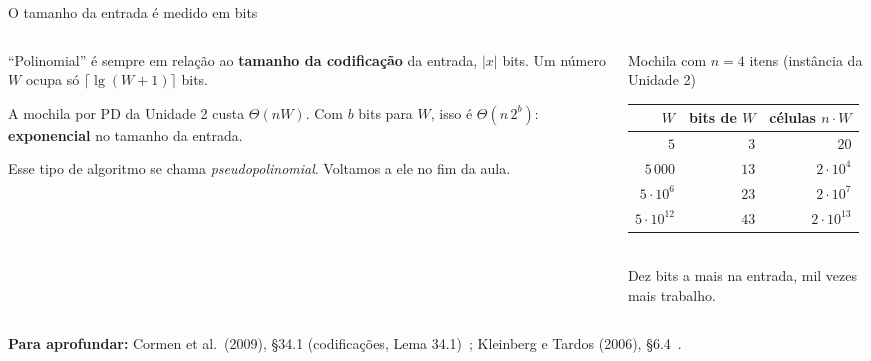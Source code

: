 \documentclass[aspectratio=169,xcolor=table]{beamer}
\newcommand{\fonte}[1]{%
  \vfill
  {\tiny\color{gray!55!black}\textbf{Para aprofundar:} #1\par}%
}
\begin{document}
\begin{frame}{O tamanho da entrada é medido em bits}
  \begin{columns}[T]
    \begin{column}{0.5\textwidth}
      \small
      ``Polinomial'' é sempre em relação ao \textbf{tamanho da codificação} da entrada,
      $|x|$ bits. Um número $W$ ocupa só $\lceil \lg (W+1) \rceil$ bits.
      \medskip

      A mochila por PD da Unidade 2 custa $\Theta(nW)$. Com $b$ bits para $W$, isso é
      $\Theta(n\, 2^b)$: \textbf{exponencial} no tamanho da entrada.
      \medskip

      {\scriptsize Esse tipo de algoritmo se chama \emph{pseudopolinomial}. Voltamos a ele no
      fim da aula.\par}
    \end{column}
    \begin{column}{0.46\textwidth}
      \scriptsize
      \centering
      Mochila com $n = 4$ itens (instância da Unidade 2)\\[3pt]
      \begin{tabular}{rrr}
        \toprule
        $W$ & bits de $W$ & células $n \cdot W$ \\
        \midrule
        $5$ & $3$ & $20$ \\
        $5\,000$ & $13$ & $2 \cdot 10^4$ \\
        $5 \cdot 10^6$ & $23$ & $2 \cdot 10^7$ \\
        $5 \cdot 10^{12}$ & $43$ & $2 \cdot 10^{13}$ \\
        \bottomrule
      \end{tabular}\\[3pt]
      Dez bits a mais na entrada, mil vezes mais trabalho.
    \end{column}
  \end{columns}
  \fonte{Cormen et al.\ (2009), \S 34.1 (codificações, Lema 34.1)~\cite{cormen2009introduction};
    Kleinberg e Tardos (2006), \S 6.4~\cite{kleinberg2006algorithm}.}
\end{frame}
\end{document}
